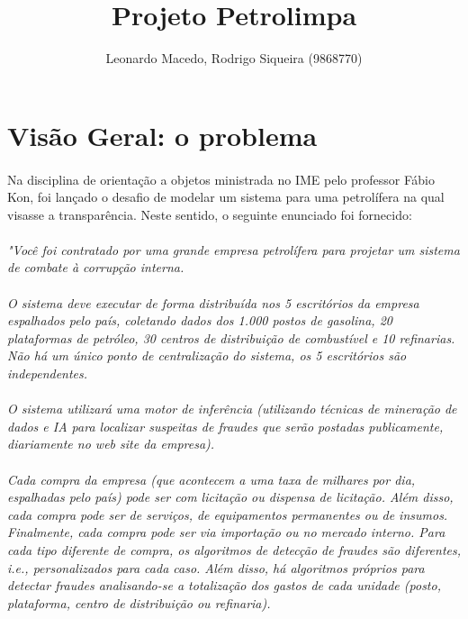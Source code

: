 \documentclass[a4paper,10pt]{article}
\title{Projeto Petrolimpa}
\author{Leonardo Macedo, Rodrigo Siqueira (9868770)}
\begin{document}
\maketitle
\titlepage
\tableofcontents

\newpage
\section{Visão Geral: o problema}

\paragraph{}
Na disciplina de orientação a objetos ministrada no IME pelo professor Fábio
Kon, foi lançado o desafio de modelar um sistema para uma petrolífera na qual
visasse a transparência. Neste sentido, o seguinte enunciado foi fornecido:

\paragraph{}
\emph{"Você foi contratado por uma grande empresa petrolífera para projetar um
sistema de combate à corrupção interna.}

\paragraph{}
\emph{O sistema deve executar de forma distribuída nos 5 escritórios da empresa
espalhados pelo país, coletando dados dos 1.000 postos de gasolina, 20
plataformas de petróleo, 30 centros de distribuição de combustível e 10
refinarias. Não há um único ponto de centralização do sistema, os 5 escritórios
são independentes.}

\paragraph{}
\emph{O sistema utilizará uma motor de inferência (utilizando técnicas de
mineração de dados e IA para localizar suspeitas de fraudes que serão postadas
publicamente, diariamente no web site da empresa).}

\paragraph{}
\emph{Cada compra da empresa (que acontecem a uma taxa de milhares por dia,
espalhadas pelo país) pode ser com licitação ou dispensa de licitação. Além
disso, cada compra pode ser de serviços, de equipamentos permanentes ou de
insumos. Finalmente, cada compra pode ser via importação ou no mercado interno.
Para cada tipo diferente de compra, os algoritmos de detecção de fraudes são
diferentes, i.e., personalizados para cada caso. Além disso, há algoritmos
próprios para detectar fraudes analisando-se a totalização dos gastos de cada
unidade (posto, plataforma, centro de distribuição ou refinaria).}
\end{document}
